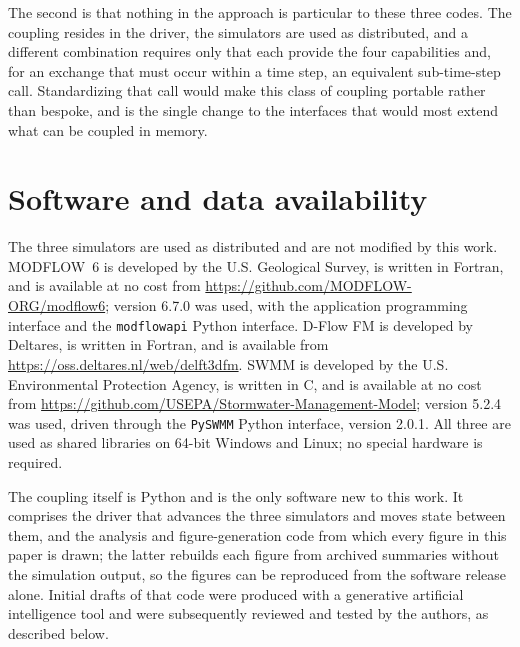 \documentclass[preprint,authoryear,11pt]{elsarticle}
\begin{document}
The second is that nothing in the approach is particular to these three codes. The coupling resides in the driver, the simulators are used as distributed, and a different combination requires only that each provide the four capabilities and, for an exchange that must occur within a time step, an equivalent sub-time-step call. Standardizing that call would make this class of coupling portable rather than bespoke, and is the single change to the interfaces that would most extend what can be coupled in memory.

\section*{Software and data availability}

The three simulators are used as distributed and are not modified by this work. MODFLOW~6 is developed by the U.S. Geological Survey, is written in Fortran, and is available at no cost from \url{https://github.com/MODFLOW-ORG/modflow6}; version 6.7.0 was used, with the application programming interface and the \texttt{modflowapi} Python interface. D-Flow FM is developed by Deltares, is written in Fortran, and is available from \url{https://oss.deltares.nl/web/delft3dfm}. SWMM is developed by the U.S. Environmental Protection Agency, is written in C, and is available at no cost from \url{https://github.com/USEPA/Stormwater-Management-Model}; version 5.2.4 was used, driven through the \texttt{PySWMM} Python interface, version 2.0.1. All three are used as shared libraries on 64-bit Windows and Linux; no special hardware is required.

The coupling itself is Python and is the only software new to this work. It comprises the driver that advances the three simulators and moves state between them, and the analysis and figure-generation code from which every figure in this paper is drawn; the latter rebuilds each figure from archived summaries without the simulation output, so the figures can be reproduced from the software release alone. Initial drafts of that code were produced with a generative artificial intelligence tool and were subsequently reviewed and tested by the authors, as described below. %
\end{document}
